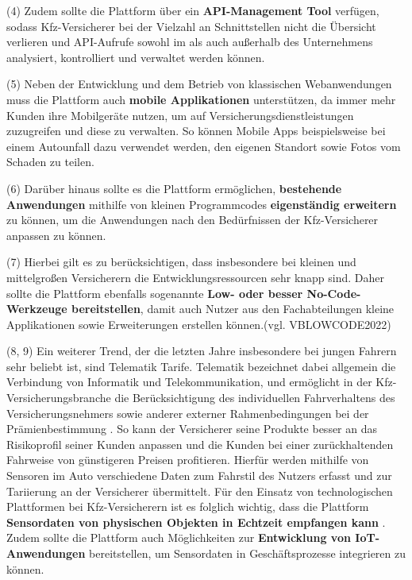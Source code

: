(4) Zudem sollte die Plattform über ein \textbf{API-Management Tool} verfügen, sodass Kfz-Versicherer bei der Vielzahl an Schnittstellen nicht die Übersicht verlieren und API-Aufrufe sowohl im als auch außerhalb des Unternehmens analysiert, kontrolliert und verwaltet werden können. \autocite[Vgl.][S. 67ff]{HANSCHKE2021}

(5) Neben der Entwicklung und dem Betrieb von klassischen Webanwendungen muss die Plattform auch \textbf{mobile Applikationen} unterstützen, da immer mehr Kunden ihre Mobilgeräte nutzen, um auf Versicherungsdienstleistungen zuzugreifen und diese zu verwalten. So können Mobile Apps beispielsweise bei einem Autounfall dazu verwendet werden, den eigenen Standort sowie Fotos vom Schaden zu teilen. \autocite[Vgl.][S. 7]{HU2020}

(6) Darüber hinaus sollte es die Plattform ermöglichen, \textbf{bestehende Anwendungen} mithilfe von kleinen Programmcodes \textbf{eigenständig erweitern} zu können, um die Anwendungen nach den Bedürfnissen der Kfz-Versicherer anpassen zu können. \autocite[Vgl.][]{WEINGARTNER2023}

(7) Hierbei gilt es zu berücksichtigen, dass insbesondere bei kleinen und mittelgroßen Versicherern die Entwicklungsressourcen sehr knapp sind. Daher sollte die Plattform ebenfalls sogenannte \textbf{Low- oder besser No-Code-Werkzeuge bereitstellen}, damit auch Nutzer aus den Fachabteilungen kleine Applikationen sowie Erweiterungen erstellen können.(vgl. VBLOWCODE2022) \autocite[Vgl.][]{VBLOWCODE2022}

(8, 9) Ein weiterer Trend, der die letzten Jahre insbesondere bei jungen Fahrern sehr beliebt ist, sind Telematik Tarife. Telematik bezeichnet dabei allgemein die Verbindung von Informatik und Telekommunikation, \autocite[Vgl.][S. 10-11]{ABTS2017} und ermöglicht in der Kfz-Versicherungsbranche die Berücksichtigung des individuellen Fahrverhaltens des Versicherungsnehmers sowie anderer externer Rahmenbedingungen bei der Prämienbestimmung \autocite[Vgl.][S. 84]{MERZINGER2017}. So kann der Versicherer seine Produkte besser an das Risikoprofil seiner Kunden anpassen und die Kunden bei einer zurückhaltenden Fahrweise von günstigeren Preisen profitieren. Hierfür werden mithilfe von Sensoren im Auto verschiedene Daten zum Fahrstil des Nutzers erfasst und zur Tariierung an der Versicherer übermittelt. \autocite[Vgl.][S. 3-4]{ELING2020} Für den Einsatz von technologischen Plattformen bei Kfz-Versicherern ist es folglich wichtig, dass die Plattform \textbf{Sensordaten von physischen Objekten in Echtzeit empfangen kann} \autocite[Vgl.][S. 10-15]{WEICHERT2015}. Zudem sollte die Plattform auch Möglichkeiten zur \textbf{Entwicklung von IoT-Anwendungen} bereitstellen, um Sensordaten in Geschäftsprozesse integrieren zu können. 

